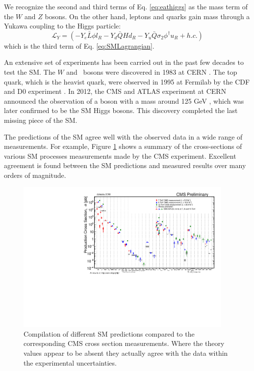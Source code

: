 \documentclass[thesis.tex]{subfiles}
\begin{document}
We recognize the second and third terms of Eq. \ref{eq:eathiggs} as the mass term of the $W$ and $Z$ bosons. On the other hand, leptons and quarks gain mass through a Yukawa coupling to the Higgs particle:
	\begin{equation}
		\mathcal{L}_Y = (- Y_e \bar{L} \phi l_R - Y_d \bar{Q}H d_R - Y_u \bar{Q} \sigma_2 \phi^\dagger u_R + h.c.)
	\end{equation}
which is the third term of Eq. \ref{eq:SMLagrangian}. 


An extensive set of experiments has been carried out in the past few decades to test the SM. 
The $W$ and \PZ~bosons were discovered in 1983 at CERN \cite{WdiscoveryUA1,WdiscoveryUA2,ZdiscoveryUA1,ZdiscoveryUA2}. 
The top quark, which is the heavist quark, were observed in 1995 at Fermilab by the CDF and D0 experiment \cite{TopdiscoveryCDF,TopdiscoveryD0}. 
In 2012, the CMS and ATLAS experiment at CERN announced the observation of a boson with a mass around 125 GeV \cite{HiggsCMS,HiggsATLAS}, which was later confirmed to be the SM Higgs bosons.
This discovery completed the last missing piece of the SM.  

The predictions of the SM agree well with the observed data in a wide range of measurements. 
For example, Figure \ref{fig1-1} shows a summary of the cross-sections of various SM processes measurements made by the CMS experiment.
Excellent agreement is found between the SM predictions and measured results over many orders of magnitude.

	\begin{figure}[htb]
		\centering
	\includegraphics[width=0.95\textwidth]{plot/SigmaNew_v0.pdf}
	\caption{Compilation of different SM predictions compared to the corresponding CMS cross section measurements. Where the theory values appear to be absent they actually agree with the data within the experimental uncertainties.}
	\label{fig1-1}
	\end{figure}
	
\end{document}
